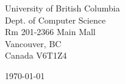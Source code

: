 \begin{minipage}{0.49\textwidth}
\begin{flushleft}
\noindent
University of British Columbia  \\
Dept. of Computer Science \\
Rm 201-2366 Main Mall \\
Vancouver, BC \\
Canada V6T1Z4
\end{flushleft}
\end{minipage}
\begin{minipage}{0.47\textwidth}
\begin{flushright}
\today
\end{flushright}
\end{minipage} \\

\newcommand{\univ}{University of British Columbia}
\newcommand{\univshort}{UBC}
\newcommand{\degree}{Ph.D.}
\newcommand{\dept}{Computer Science}